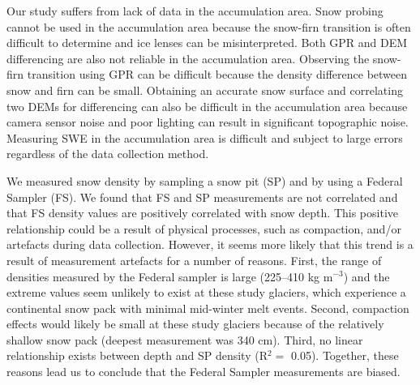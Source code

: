 \documentclass[review,oneside, letterpaper]{igs}
\begin{document}
Our study suffers from lack of data in the accumulation area. Snow probing cannot be used in the accumulation area because the snow-firn transition is often difficult to determine and ice lenses can be misinterpreted. Both GPR and DEM differencing are also not reliable in the accumulation area. Observing the snow-firn transition using GPR can be difficult because the density difference between snow and firn can be small. Obtaining an accurate snow surface and correlating two DEMs for differencing can also be difficult in the accumulation area because camera sensor noise and poor lighting can result in significant topographic noise. Measuring SWE in the accumulation area is difficult and subject to large errors regardless of the data collection method.

We measured snow density by sampling a snow pit (SP) and by using a Federal Sampler (FS). We found that FS and SP measurements are not correlated and that FS density values are positively correlated with snow depth. This positive relationship could be a result of physical processes, such as compaction, and/or artefacts during data collection. However, it seems more likely that this trend is a result of measurement artefacts for a number of reasons. First, the range of densities measured by the Federal sampler is large (225--410 kg m$^{-3}$) and the extreme values seem unlikely to exist at these study glaciers, which experience a continental snow pack with minimal mid-winter melt events. Second, compaction effects would likely be small at these study glaciers because of the relatively shallow snow pack (deepest measurement was 340 cm). Third, no linear relationship exists between depth and SP density (R$^2=$ 0.05). Together, these reasons lead us to conclude that the Federal Sampler measurements are biased. 
\end{document}
